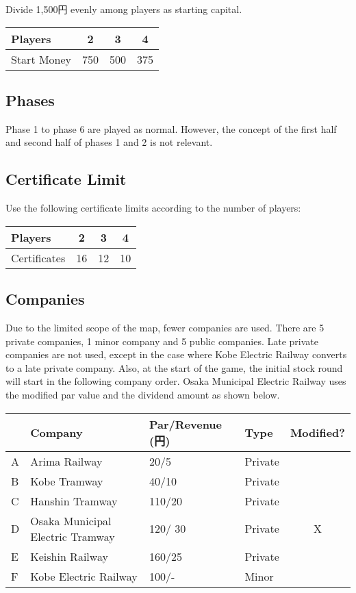 \documentclass{article}
\begin{document}
\begin{CJK}{UTF8}{min}
\begin{multicols}{2}
Divide 1,500円 evenly among players as starting capital.

\begin{tabular}{|l|c|c|c|}
\hline
Players & 2 & 3 & 4 \\
\hline
Start Money & 750 & 500 & 375 \\
\hline
\end{tabular}

\subsection{Phases}
Phase 1 to phase 6 are played as normal. However, the concept of the
first half and second half of phases 1 and 2 is not relevant.

\subsection{Certificate Limit}
Use the following certificate limits according to the number of players:

\begin{tabular}{|l|c|c|c|}
\hline
Players & 2 & 3 & 4 \\
\hline
Certificates & 16 & 12 & 10 \\
\hline
\end{tabular}

\subsection{Companies}
Due to the limited scope of the map, fewer companies are used. There
are 5 private companies, 1 minor company and 5 public companies. Late
private companies are not used, except in the case where Kobe Electric
Railway converts to a late private company. Also, at the start of the
game, the initial stock round will start in the following company
order. Osaka Municipal Electric Railway uses the modified par
value and the dividend amount as shown below.

\begin{tabular}{lp{2cm}llc}
 & Company & Par/Revenue (円) & Type & Modified? \\
\hline
A & Arima Railway & 20/5 & Private  & \\
B & Kobe Tramway & 40/10 & Private  & \\
C & Hanshin Tramway & 110/20 & Private  & \\
D & Osaka Municipal Electric Tramway & 120/ 30 & Private  & X \\
E & Keishin Railway & 160/25 & Private & \\
F & Kobe Electric Railway & 100/- & Minor & \\
\end{tabular}


\end{multicols}
\end{CJK}
\end{document}
